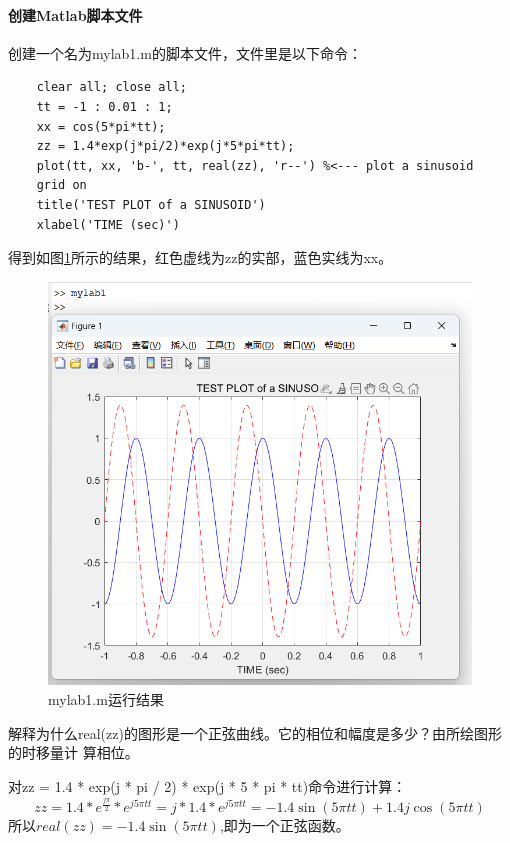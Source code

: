 \documentclass[UTF8]{ctexart}
\begin{document}
\paragraph{创建Matlab脚本文件}
创建一个名为mylab1.m的脚本文件，文件里是以下命令：
\begin{verbatim}
    clear all; close all;
    tt = -1 : 0.01 : 1; 
    xx = cos(5*pi*tt); 
    zz = 1.4*exp(j*pi/2)*exp(j*5*pi*tt); 
    plot(tt, xx, 'b-', tt, real(zz), 'r--') %<--- plot a sinusoid 
    grid on 
    title('TEST PLOT of a SINUSOID') 
    xlabel('TIME (sec)') 
\end{verbatim}
得到如图\ref{img:mylab1}所示的结果，红色虚线为zz的实部，蓝色实线为xx。
\begin{figure}[htbp]
    \centering
    \includegraphics[width=0.7\linewidth]{mylab1.png}
    \caption{mylab1.m运行结果}
    \label{img:mylab1}
\end{figure}
\begin{framed}
    解释为什么real(zz)的图形是一个正弦曲线。它的相位和幅度是多少？由所绘图形的时移量计
    算相位。
\end{framed}
对zz = 1.4 * exp(j * pi / 2) * exp(j * 5 * pi * tt)命令进行计算：
$$
    zz = 1.4*e^\frac{j\pi}{2}*e^{j5\pi tt}=j*1.4*e^{j5\pi tt}=-1.4\sin(5\pi tt)+1.4j\cos(5\pi tt)
$$
所以$real(zz)=-1.4\sin(5\pi tt)$,即为一个正弦函数。
\end{document}
